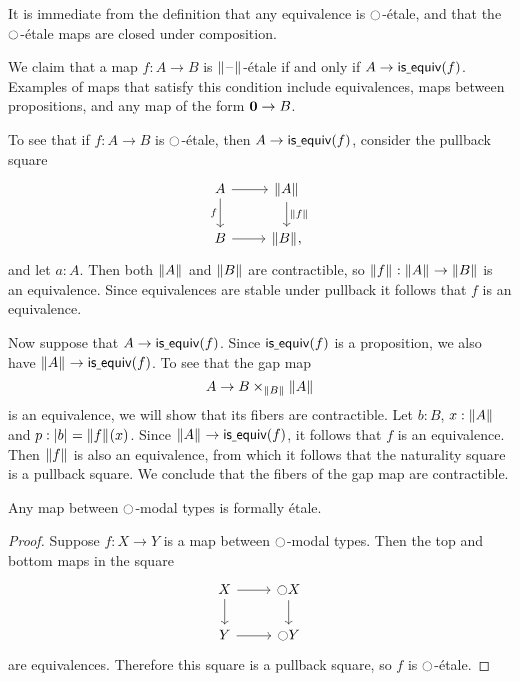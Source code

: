 \documentclass[9pt,twosided]{amsart}
\begin{document}
It is immediate from the definition that any equivalence is ${\ocircle}$-\'etale, and that the ${\ocircle}$-\'etale maps are closed under composition.

\begin{eg}\label{eg:etale_prop}
We claim that a map $f:A\to B$ is $\brck{\blank}$-\'etale if and only if $A\to \mathsf{is\underline{\ }{}equiv}(f)$. Examples of maps that satisfy this condition include equivalences, maps between propositions, and any map of the form $\mathbf{0}\to B$.

To see that if $f:A\to B$ is ${\ocircle}$-\'etale, then $A\to\mathsf{is\underline{\ }{}equiv}(f)$, consider the pullback square
\begin{equation*}
\begin{tikzcd}
A \arrow[r] \arrow[d,swap,"f"] & \brck{A} \arrow[d,"\brck{f}"] \\
B \arrow[r] & \brck{B},
\end{tikzcd}
\end{equation*}
and let $a:A$. Then both $\brck{A}$ and $\brck{B}$ are contractible, so $\brck{f}:\brck{A}\to\brck{B}$ is an equivalence. Since equivalences are stable under pullback it follows that $f$ is an equivalence.

Now suppose that $A\to \mathsf{is\underline{\ }{}equiv}(f)$. Since $\mathsf{is\underline{\ }{}equiv}(f)$ is a proposition, we also have $\brck{A}\to\isequiv(f)$. To see that the gap map
\begin{equation*}
A \to B\times_{\brck{B}}\brck{A}
\end{equation*}
is an equivalence, we will show that its fibers are contractible. Let $b:B$, $x:\brck{A}$ and $p:\bproj{b}=\brck{f}(x)$. Since $\brck{A}\to\isequiv(f)$, it follows that $f$ is an equivalence. Then $\brck{f}$ is also an equivalence, from which it follows that the naturality square is a pullback square. We conclude that the fibers of the gap map are contractible. 
\end{eg}

\begin{lem}\label{lem:etale_modal}
Any map between ${\ocircle}$-modal types is formally \'etale.
\end{lem}

\begin{proof}
Suppose $f:X\to Y$ is a map between ${\ocircle}$-modal types. Then the top and bottom maps in the square
\begin{equation*}
\begin{tikzcd}
X \arrow[r] \arrow[d] & \modal X \arrow[d] \\
Y \arrow[r] & \modal Y
\end{tikzcd}
\end{equation*}
are equivalences. Therefore this square is a pullback square, so $f$ is ${\ocircle}$-\'etale.
\end{proof}
\end{document}
